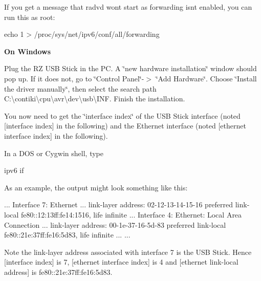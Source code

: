 If you get a message that radvd won\textquotesingle{}t start as forwarding isn\textquotesingle{}t enabled, you can run this as root\+:

\begin{DoxyVerb}echo 1 > /proc/sys/net/ipv6/conf/all/forwarding
\end{DoxyVerb}


{\bfseries On Windows}~\newline


Plug the RZ U\+SB Stick in the PC. A \char`\"{}new hardware installation\char`\"{} window should pop up. If it does not, go to \char`\"{}\+Control Panel\char`\"{}-\/$>$ \char`\"{}\+Add Hardware\char`\"{}. Choose \char`\"{}\+Install the driver manually\char`\"{}, then select the search path C\+:\textbackslash{}contiki\textbackslash{}cpu\textbackslash{}avr\textbackslash{}dev\textbackslash{}usb\textbackslash{}I\+NF. Finish the installation.

You now need to get the \char`\"{}interface index\char`\"{} of the U\+SB Stick interface (noted \mbox{[}interface index\mbox{]} in the following) and the Ethernet interface (noted \mbox{[}ethernet interface index\mbox{]} in the following).

In a D\+OS or Cygwin shell, type \begin{DoxyVerb}ipv6 if
\end{DoxyVerb}


As an example, the output might look something like this\+:

\begin{DoxyVerb}...
Interface 7: Ethernet
 ...
 link-layer address: 02-12-13-14-15-16
 preferred link-local fe80::12:13ff:fe14:1516, life infinite
 ...
Interface 4: Ethernet: Local Area Connection
 ...
 link-layer address: 00-1e-37-16-5d-83
 preferred link-local fe80::21e:37ff:fe16:5d83, life infinite
 ...
...
\end{DoxyVerb}


Note the link-\/layer address associated with interface 7 is the U\+SB Stick. Hence \mbox{[}interface index\mbox{]} is 7, \mbox{[}ethernet interface index\mbox{]} is 4 and \mbox{[}ethernet link-\/local address\mbox{]} is fe80\+:\+:21e\+:37ff\+:fe16\+:5d83.

